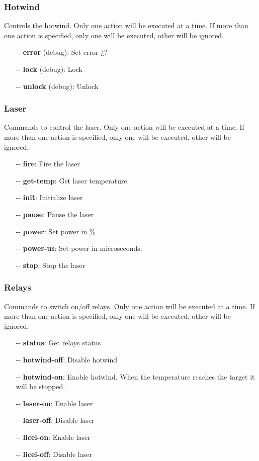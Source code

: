 \documentclass[letterpaper, 10 pt]{article}
\begin{document}
\subsubsection{Hotwind}
Controls the hotwind. Only one action will be executed at a time. If more than one action is specified, only one will be executed, other will be ignored.
\begin{itemize}
	\item[-{}-] \textbf{error} (debug): Set error ¿?
	\item[-{}-] \textbf{lock} (debug): Lock
	\item[-{}-] \textbf{unlock} (debug): Unlock
\end{itemize}

\subsubsection{Laser}
Commands to control the laser. Only one action will be executed at a time. If more than one action is specified, only one will be executed, other will be ignored.
\begin{itemize}
	\item[-{}-] \textbf{fire}: Fire the laser
	\item[-{}-] \textbf{get-temp}: Get laser temperature.
	\item[-{}-] \textbf{init}: Initialize laser
	\item[-{}-] \textbf{pause}: Pause the laser
	\item[-{}-] \textbf{power}: Set power in \%
	\item[-{}-] \textbf{power-us}: Set power in microseconds.
	\item[-{}-] \textbf{stop}: Stop the laser
\end{itemize}

\subsubsection{Relays}
Commands to switch on/off relays. Only one action will be executed at a time. If more than one action is specified, only one will be executed, other will be ignored.
\begin{itemize}
	\item[-{}-] \textbf{status}: Get relays status
	\item[-{}-] \textbf{hotwind-off}: Disable hotwind
	\item[-{}-] \textbf{hotwind-on}: Enable hotwind. When the temperature reaches the target it will be stopped.
	\item[-{}-] \textbf{laser-on}: Enable laser
	\item[-{}-] \textbf{laser-off}: Disable laser
	\item[-{}-] \textbf{licel-on}: Enable laser
	\item[-{}-] \textbf{licel-off}: Disable laser
\end{itemize}
\end{document}
